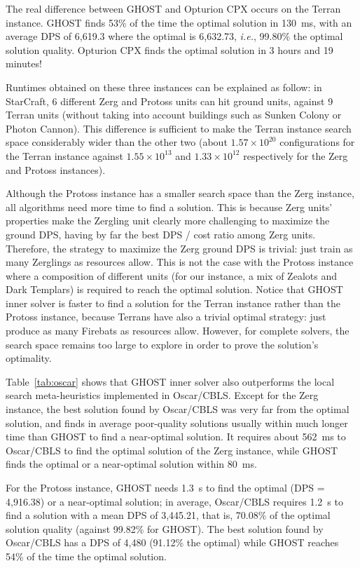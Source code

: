 \documentclass[journal]{IEEEtran}
\newcommand{\ghost}{\textsc{GHOST}\xspace}
\newcommand{\ie}{\textit{i.e.}}
\begin{document}
The  real difference  between \ghost  and Opturion  CPX occurs  on the
Terran  instance. \ghost finds  53\% of  the time  the optimal
solution in 130~ms, with an average DPS of 6,619.3 where the
optimal  is  6,632.73,  \ie,  99.80\% the  optimal  solution  quality.
Opturion CPX finds the optimal solution in 3 hours and 19 minutes!

Runtimes obtained on these three instances can be explained as follow:
in StarCraft, 6 different Zerg and Protoss units can hit ground units,
against 9 Terran units (without taking into account buildings
such  as  Sunken  Colony  or   Photon  Cannon).   This  difference  is
sufficient to make the Terran instance search space considerably wider
than the  other two (about  $1.57 \times 10^{20}$  configurations for
the Terran  instance against  $1.55 \times  10^{13}$ and  $1.33 \times
10^{12}$ respectively for the Zerg and Protoss instances).

Although the Protoss instance has a smaller search space than the Zerg
instance, all algorithms  need more time to find a  solution.  This is
because Zerg  units' properties make  the Zergling unit  clearly more
challenging to maximize  the ground DPS, having by far  the best DPS /
cost ratio among  Zerg units.  Therefore, the strategy  to maximize the
Zerg ground DPS is trivial: just  train as many Zerglings as resources
allow. This  is not the case with the  Protoss instance where a
composition of different units (for our instance, a mix of Zealots and
Dark Templars) is required to  reach the optimal solution. Notice that
\ghost  inner solver is  faster to find  a solution for  the Terran
instance rather  than the  Protoss instance,  because Terrans
have also a trivial optimal strategy: just produce as many Firebats as
resources allow. However,  for complete solvers, the search  space remains
too large to explore in order to prove the solution's optimality.

Table~\ref{tab:oscar} shows that \ghost  inner solver also outperforms
the local search meta-heuristics implemented in Oscar/CBLS. Except for
the Zerg instance, the best solution  found by Oscar/CBLS was very far
from the optimal solution, and  finds in average poor-quality solutions
usually within  much longer  time than \ghost  to find  a near-optimal
solution. It  requires about 562~ms  to Oscar/CBLS to find  the optimal
solution of  the Zerg  instance, while  \ghost finds  the optimal  or a
near-optimal solution within 80~ms.

For the Protoss instance, \ghost needs 1.3~s to find the optimal (DPS =
4,916.38) or a near-optimal  solution; in average, Oscar/CBLS requires
1.2~s to find a solution with a  mean DPS of 3,445.21, that is, 70.08\%
of the optimal solution quality (against 99.82\% for \ghost). The best
solution found by Oscar/CBLS has a  DPS of 4,480 (91.12\% the optimal)
while \ghost reaches 54\% of the time the optimal solution.
\end{document}
